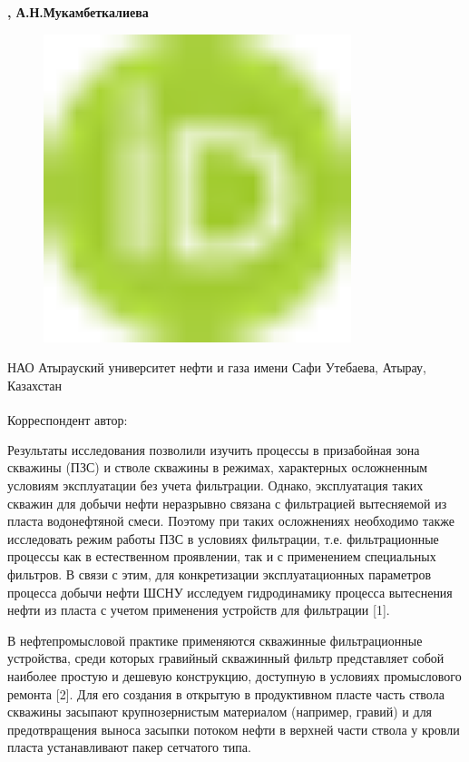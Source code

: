 {\bfseries ,
А.Н.Мукамбеткалиева}
\begin{figure}[H]
	\centering
	\includegraphics[width=0.8\textwidth]{media/gorn/image1}
	\caption*{}
\end{figure}


НАО Атырауский университет нефти и газа имени Сафи Утебаева, Атырау,
Казахстан

{\bfseries \textsuperscript{\envelope }}Корреспондент автор:
\href{mailto:maks_bisengali@mail.ru}{}

Результаты исследования позволили изучить процессы в призабойная зона
скважины (ПЗС) и стволе скважины в режимах, характерных осложненным
условиям эксплуатации без учета фильтрации. Однако, эксплуатация таких
скважин для добычи нефти неразрывно связана с фильтрацией вытесняемой из
пласта водонефтяной смеси. Поэтому при таких осложнениях необходимо
также исследовать режим работы ПЗС в условиях фильтрации, т.е.
фильтрационные процессы как в естественном проявлении, так и с
применением специальных фильтров. В связи с этим, для конкретизации
эксплуатационных параметров процесса добычи нефти ШСНУ исследуем
гидродинамику процесса вытеснения нефти из пласта с учетом применения
устройств для фильтрации {[}1{]}.

В нефтепромысловой практике применяются скважинные фильтрационные
устройства, среди которых гравийный скважинный фильтр представляет собой
наиболее простую и дешевую конструкцию, доступную в условиях
промыслового ремонта {[}2{]}. Для его создания в открытую в продуктивном
пласте часть ствола скважины засыпают крупнозернистым материалом
(например, гравий) и для предотвращения выноса засыпки потоком нефти в
верхней части ствола у кровли пласта устанавливают пакер сетчатого типа.

